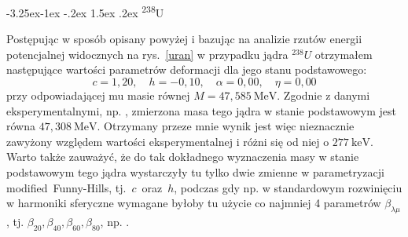 \documentclass[a4paper,polish]{article}
\makeatletter
\renewcommand\subsubsection{\@startsection{subsubsection}{3}{\z@}%
	{-3.25ex\@plus -1ex \@minus -.2ex}%
	{1.5ex \@plus .2ex}%
	{\normalfont\normalsize\bfseries\boldmath}}
\numberwithin{equation}{section}
\makeatother
\begin{document}
\clearpage
\subsubsection{\textsuperscript{238}U}

Postępując w sposób opisany powyżej i bazując na analizie rzutów energii potencjalnej widocznych na rys.~\ref{uran} w przypadku jądra $^{238}U$ otrzymałem następujące wartości parametrów deformacji dla jego stanu podstawowego:
\begin{equation*}
c=1,20, \quad h=-0,10, \quad \alpha=0,00, \quad \eta= 0,00
\end{equation*}
przy odpowiadającej mu masie równej $M=47,585~\mathrm{MeV}$. Zgodnie z danymi eksperymentalnymi, np. \cite{brookhaven}, zmierzona masa tego jądra w stanie podstawowym jest równa $47,308~\mathrm{MeV}$. Otrzymany przeze mnie wynik jest więc nieznacznie zawyżony względem wartości eksperymentalnej i różni się od niej o $277~\mathrm{keV}$. Warto także zauważyć, że do tak dokładnego wyznaczenia masy w stanie podstawowym tego jądra wystarczyły tu tylko dwie zmienne w parametryzacji \mbox{modified Funny-Hills}, \mbox{tj. $c$ oraz $h$}, podczas gdy np. w standardowym rozwinięciu w harmoniki sferyczne wymagane byłoby tu użycie co najmniej 4 parametrów $\beta_{\lambda \mu}$, tj. $\beta_{20},\beta_{40},\beta_{60},\beta_{80}$, np. \cite{JACHBF}.
\end{document}
